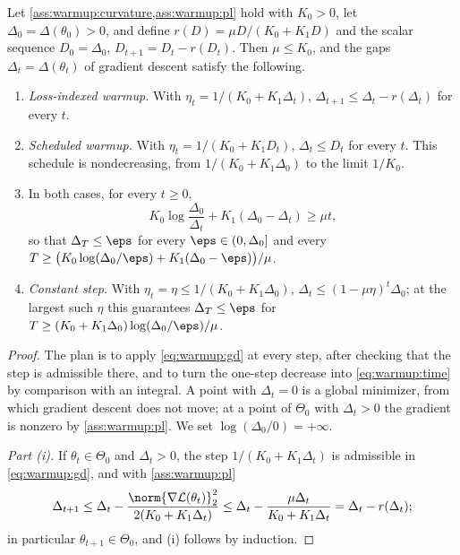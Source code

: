 \begin{refsection}
\begin{theorem}\label{thm:warmup:schedule}
Let \cref{ass:warmup:curvature,ass:warmup:pl} hold with $K_0>0$, let $\Delta_0=\Delta(\theta_0)>0$, and define $r(D)=\mu D/(K_0+K_1D)$ and the scalar sequence $D_0=\Delta_0$, $D_{t+1}=D_t-r(D_t)$. Then $\mu\le K_0$, and the gaps $\Delta_t=\Delta(\theta_t)$ of gradient descent satisfy the following.
\begin{enumerate}
\item \emph{Loss-indexed warmup.} With $\eta_t=1/(K_0+K_1\Delta_t)$, $\Delta_{t+1}\le\Delta_t-r(\Delta_t)$ for every $t$.
\item \emph{Scheduled warmup.} With $\eta_t=1/(K_0+K_1D_t)$, $\Delta_t\le D_t$ for every $t$. This schedule is nondecreasing, from $1/(K_0+K_1\Delta_0)$ to the limit $1/K_0$.
\item In both cases, for every $t\ge0$,
\begin{equation}\label{eq:warmup:time}
  K_0\log\frac{\Delta_0}{\Delta_t}+K_1(\Delta_0-\Delta_t)\ge\mu t,
\end{equation}
so that $\Delta_T\le\eps$ for every $\eps\in(0,\Delta_0]$ and every $T\ge\bigl(K_0\log(\Delta_0/\eps)+K_1(\Delta_0-\eps)\bigr)/\mu$.
\item \emph{Constant step.} With $\eta_t=\eta\le1/(K_0+K_1\Delta_0)$, $\Delta_t\le(1-\mu\eta)^t\Delta_0$; at the largest such $\eta$ this guarantees $\Delta_T\le\eps$ for $T\ge(K_0+K_1\Delta_0)\log(\Delta_0/\eps)/\mu$.
\end{enumerate}
\end{theorem}

\begin{proof}
The plan is to apply \eqref{eq:warmup:gd} at every step, after checking that the step is admissible there, and to turn the one-step decrease into \eqref{eq:warmup:time} by comparison with an integral. A point with $\Delta_t=0$ is a global minimizer, from which gradient descent does not move; at a point of $\Theta_0$ with $\Delta_t>0$ the gradient is nonzero by \cref{ass:warmup:pl}. We set $\log(\Delta_0/0)=+\infty$.

\emph{Part (i).} If $\theta_t\in\Theta_0$ and $\Delta_t>0$, the step $1/(K_0+K_1\Delta_t)$ is admissible in \eqref{eq:warmup:gd}, and with \cref{ass:warmup:pl}
\[
  \Delta_{t+1}\le\Delta_t-\frac{\norm{\nabla\Loss(\theta_t)}_2^2}{2(K_0+K_1\Delta_t)}\le\Delta_t-\frac{\mu\Delta_t}{K_0+K_1\Delta_t}=\Delta_t-r(\Delta_t);
\]
in particular $\theta_{t+1}\in\Theta_0$, and (i) follows by induction.


\end{proof}
\end{refsection}
